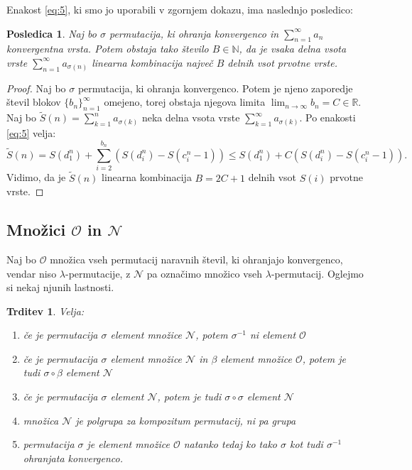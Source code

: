 \documentclass[12pt,a4paper,reqno]{amsart}
\theoremstyle{definition} %
\theoremstyle{plain} %
\newtheorem{trditev}[definicija]{Trditev}
\newtheorem{posledica}[definicija]{Posledica}
\newcommand{\R}{\mathbb R}
\begin{document}
Enakost \ref{eq:5}, ki smo jo uporabili v zgornjem dokazu, ima naslednjo posledico:
\begin{posledica}
Naj bo $\sigma$ permutacija, ki ohranja konvergenco in $\sum^{\infty}_{n=1}a_n$ konvergentna vrsta. Potem obstaja tako število $B\in \mathbb{N}$, da je vsaka delna vsota vrste $\sum^{\infty}_{n=1}a_{\sigma(n)}$ linearna kombinacija največ $B$ delnih vsot prvotne vrste.
\end{posledica}

\begin{proof}
Naj bo $\sigma$ permutacija, ki ohranja konvergenco. Potem je njeno zaporedje števil blokov $\{b_n\}_{n=1}^{\infty}$ omejeno, torej obstaja njegova limita $\lim_{n \to \infty}b_n = C\in \R$. Naj bo $\tilde{S}(n)=\sum_{k=1}^{n}a_{\sigma(k)}$ neka delna vsota vrste $\sum_{k=1}^{\infty}a_{\sigma(k)}$. Po enakosti \ref{eq:5} velja: $$\tilde{S}(n)=S(d_1^n)+\sum_{i=2}^{b_n}(S(d_i^n)-S(c_i^n-1))\leq S(d_1^n)+C(S(d_i^n)-S(c_i^n-1)).$$ Vidimo, da je $\tilde{S}(n)$ linearna kombinacija $B=2C+1$ delnih vsot $S(i)$ prvotne vrste.
\end{proof}

\subsection{Množici $\mathcal{O}$ in $\mathcal{N}$}

Naj bo $\mathcal{O}$ množica vseh permutacij naravnih števil, ki ohranjajo konvergenco, vendar niso $\lambda$-permutacije, z $\mathcal{N}$ pa označimo množico vseh $\lambda$-permutacij. Oglejmo si nekaj njunih lastnosti.

\begin{trditev}\label{trd:o in n}
Velja:
\begin{enumerate}
\item če je permutacija $\sigma$ element množice $\mathcal{N}$, potem $\sigma^{-1}$ ni element $\mathcal{O}$ \label{itm1:1}
\item če je permutacija $\sigma$ element množice $\mathcal{N}$  in $\beta$ element množice $\mathcal{O}$, potem je tudi $\sigma \circ \beta$ element $\mathcal{N}$ \label{itm1:2}
\item če je permutacija $\sigma$ element $\mathcal{N}$, potem je tudi $\sigma \circ \sigma$ element $\mathcal{N}$ \label{itm1:3}
\item množica $\mathcal{N}$ je polgrupa za kompozitum permutacij, ni pa grupa \label{itm1:4}
\item permutacija $\sigma$ je element množice $\mathcal{O}$ natanko tedaj ko tako $\sigma$ kot tudi $\sigma^{-1}$ ohranjata konvergenco.
\end{enumerate}
\end{trditev}
\end{document}
